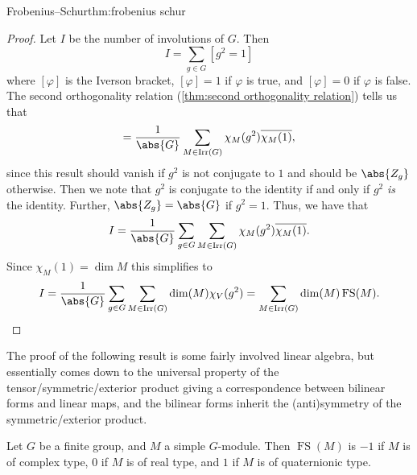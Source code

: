 \documentclass[fleqn]{NotesClass}
\DeclareMathOperator{\Irr}{Irr}
\DeclareMathOperator{\frobeniusSchur}{FS}
\begin{document}
\begin{thm}{Frobenius--Schur}{thm:frobenius schur}
\begin{proof}
            Let \(I\) be the number of involutions of \(G\).
            Then
            \begin{equation}
                I = \sum_{g \in G} [g^2 = 1]
            \end{equation}
            where \([\varphi]\) is the Iverson bracket, \([\varphi] = 1\) if \(\varphi\) is true, and \([\varphi] = 0\) if \(\varphi\) is false.
            The second orthogonality relation (\cref{thm:second orthogonality relation}) tells us that
            \begin{equation}
                [g^2 = 1] = \frac{1}{\abs{G}} \sum_{M \in \Irr(G)} \chi_M(g^2) \overline{\chi_M(1)},
            \end{equation}
            since this result should vanish if \(g^2\) is not conjugate to \(1\) and should be \(\abs{Z_g}\) otherwise.
            Then we note that \(g^2\) is conjugate to the identity if and only if \(g^2\) \emph{is} the identity.
            Further, \(\abs{Z_g} = \abs{G}\) if \(g^2 = 1\).
            Thus, we have that
            \begin{equation}
                I = \frac{1}{\abs{G}}\sum_{g \in G} \sum_{M \in \Irr(G)} \chi_M(g^2) \overline{\chi_M(1)}.
            \end{equation}
            Since \(\chi_M(1) = \dim M\) this simplifies to
            \begin{equation}
                I = \frac{1}{\abs{G}} \sum_{g \in G} \sum_{M \in \Irr(G)} \dim(M) \chi_V(g^2) = \sum_{M \in \Irr(G)} \dim(M) \frobeniusSchur(M).
            \end{equation}
        \end{proof}
    \end{thm}
    
    The proof of the following result is some fairly involved linear algebra, but essentially comes down to the universal property of the tensor/symmetric/exterior product giving a correspondence between bilinear forms and linear maps, and the bilinear forms inherit the (anti)symmetry of the symmetric/exterior product.
    
    \begin{prp}{}{}
        Let \(G\) be a finite group, and \(M\) a simple \(G\)-module.
        Then \(\frobeniusSchur(M)\) is \(-1\) if \(M\) is of complex type, \(0\) if \(M\) is of real type, and \(1\) if \(M\) is of quaternionic type.
    \end{prp}
    
\end{document}
